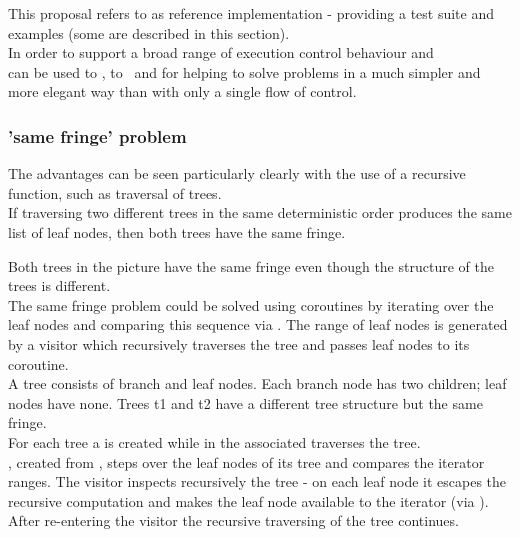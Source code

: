 
This proposal refers to \boostcoroutine as reference implementation - providing
a test suite and examples (some are described in this section).\\
\newline
In order to support a broad range of execution control behaviour \pushcoro and\\
\pullcoro can be used to \escrecloops, to \escreccomps~and for \coopmultitasking
helping to solve problems in a much simpler and more elegant way than with only
a single flow of control.\\

\subsubsection*{'same fringe' problem}
The advantages can be seen particularly clearly with the use of a recursive
function, such as traversal of trees.\\
If traversing two different trees in the same deterministic order produces the
same list of leaf nodes, then both trees have the same fringe.\\


Both trees in the picture have the same fringe even though the structure of the
trees is different.\\
\newline
The same fringe problem could be solved using coroutines by iterating over the
leaf nodes and comparing this sequence via . The range of leaf
nodes is generated by a visitor which recursively traverses the tree and passes
leaf nodes to its coroutine.\\
\newline
{}
A tree consists of branch and leaf nodes. Each branch node has two children;
leaf nodes have none. Trees t1 and t2 have a different tree structure but the
same fringe.\\
For each tree a \pullcoro is created while in the associated \corofunction
{} traverses the tree.\\
\pullcoroiterator, created from \pullcoro, steps over the leaf nodes of its tree
and  compares the iterator ranges.
\newline
\newline
{}
The visitor inspects recursively the tree - on each leaf node it escapes the
recursive computation and makes the leaf node available to the iterator (via
\pushcoro). After re-entering the visitor the recursive traversing of the tree
continues.

